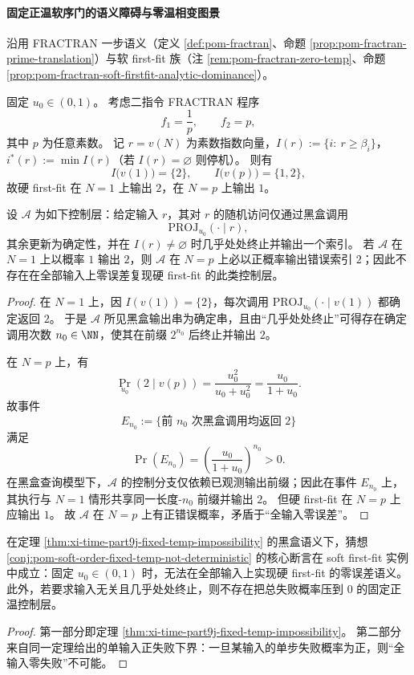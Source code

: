 \paragraph{固定正温软序门的语义障碍与零温相变图景}
沿用 FRACTRAN 一步语义（定义 \ref{def:pom-fractran}、命题 \ref{prop:pom-fractran-prime-translation}）与软 first-fit 族（注 \ref{rem:pom-fractran-zero-temp}、命题 \ref{prop:pom-fractran-soft-firstfit-analytic-dominance}）。

\begin{theorem}\label{thm:xi-time-part9j-fixed-temp-impossibility}
固定 \(u_0\in(0,1)\)。
考虑二指令 FRACTRAN 程序
\[
f_1=\frac1p,\qquad f_2=p,
\]
其中 \(p\) 为任意素数。
记 \(r=v(N)\) 为素数指数向量，\(I(r):=\{i:\ r\ge \beta_i\}\)，\(i^\ast(r):=\min I(r)\)（若 \(I(r)=\varnothing\) 则停机）。
则有
\[
I\bigl(v(1)\bigr)=\{2\},\qquad I\bigl(v(p)\bigr)=\{1,2\},
\]
故硬 first-fit 在 \(N=1\) 上输出 \(2\)，在 \(N=p\) 上输出 \(1\)。

设 \(\mathcal A\) 为如下控制层：给定输入 \(r\)，其对 \(r\) 的随机访问仅通过黑盒调用
\[
\mathrm{PROJ}_{u_0}(\cdot\mid r),
\]
其余更新为确定性，并在 \(I(r)\neq\varnothing\) 时几乎处处终止并输出一个索引。
若 \(\mathcal A\) 在 \(N=1\) 上以概率 \(1\) 输出 \(2\)，则 \(\mathcal A\) 在 \(N=p\) 上必以正概率输出错误索引 \(2\)；因此不存在在全部输入上零误差复现硬 first-fit 的此类控制层。
\end{theorem}
\begin{proof}
在 \(N=1\) 上，因 \(I(v(1))=\{2\}\)，每次调用 \(\mathrm{PROJ}_{u_0}(\cdot\mid v(1))\) 都确定返回 \(2\)。
于是 \(\mathcal A\) 所见黑盒输出串为确定串，且由“几乎处处终止”可得存在确定调用次数 \(n_0\in\NN\)，使其在前缀 \(2^{n_0}\) 后终止并输出 \(2\)。

在 \(N=p\) 上，有
\[
\Pr_{u_0}(2\mid v(p))
=
\frac{u_0^2}{u_0+u_0^2}
=
\frac{u_0}{1+u_0}.
\]
故事件
\[
E_{n_0}:=\{\text{前 }n_0\text{ 次黑盒调用均返回 }2\}
\]
满足
\[
\Pr(E_{n_0})=\left(\frac{u_0}{1+u_0}\right)^{n_0}>0.
\]
在黑盒查询模型下，\(\mathcal A\) 的控制分支仅依赖已观测输出前缀；因此在事件 \(E_{n_0}\) 上，其执行与 \(N=1\) 情形共享同一长度-\(n_0\) 前缀并输出 \(2\)。
但硬 first-fit 在 \(N=p\) 上应输出 \(1\)。
故 \(\mathcal A\) 在 \(N=p\) 上有正错误概率，矛盾于“全输入零误差”。
\end{proof}

\begin{corollary}\label{cor:xi-time-part9j-soft-firstfit-conjecture-instance}
在定理 \ref{thm:xi-time-part9j-fixed-temp-impossibility} 的黑盒语义下，猜想
\ref{conj:pom-soft-order-fixed-temp-not-deterministic}
的核心断言在 soft first-fit 实例中成立：固定 \(u_0\in(0,1)\) 时，无法在全部输入上实现硬 first-fit 的零误差语义。
此外，若要求输入无关且几乎处处终止，则不存在把总失败概率压到 \(0\) 的固定正温控制层。
\end{corollary}
\begin{proof}
第一部分即定理 \ref{thm:xi-time-part9j-fixed-temp-impossibility}。
第二部分来自同一定理给出的单输入正失败下界：一旦某输入的单步失败概率为正，则“全输入零失败”不可能。
\end{proof}

